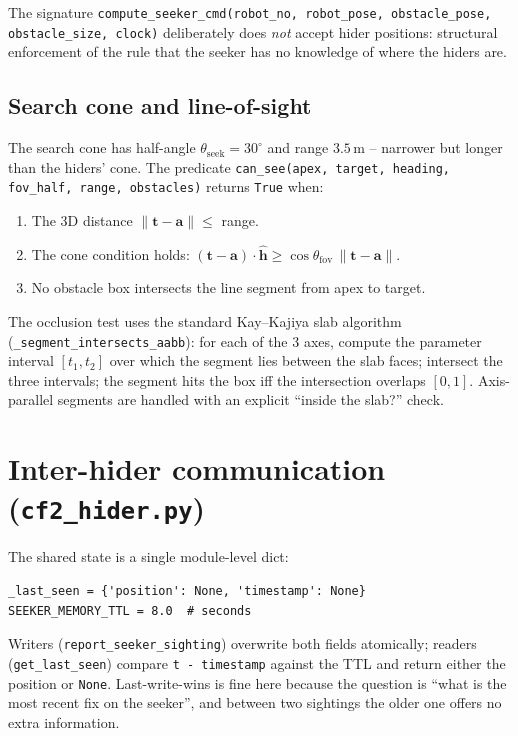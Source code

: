 \documentclass[11pt,a4paper]{article}
\newcommand{\code}[1]{\texttt{#1}}
\newcommand{\vect}[1]{\mathbf{#1}}
\begin{document}
The signature \code{compute\_seeker\_cmd(robot\_no, robot\_pose,
obstacle\_pose, obstacle\_size, clock)} deliberately does \emph{not} accept
hider positions: structural enforcement of the rule that the seeker has no
knowledge of where the hiders are.

\subsection{Search cone and line-of-sight}

The search cone has half-angle $\theta_\mathrm{seek} = 30^\circ$ and range
$3.5$\,m -- narrower but longer than the hiders' cone. The predicate
\code{can\_see(apex, target, heading, fov\_half, range, obstacles)} returns
\code{True} when:
\begin{enumerate}[leftmargin=1.4em]
  \item The 3D distance $\|\vect{t} - \vect{a}\| \le$ range.
  \item The cone condition holds: $(\vect{t} - \vect{a}) \cdot \hat{\vect{h}}
        \ge \cos\theta_\mathrm{fov}\,\|\vect{t} - \vect{a}\|$.
  \item No obstacle box intersects the line segment from apex to target.
\end{enumerate}

The occlusion test uses the standard Kay--Kajiya slab algorithm
(\code{\_segment\_intersects\_aabb}): for each of the 3 axes, compute the
parameter interval $[t_1, t_2]$ over which the segment lies between the slab
faces; intersect the three intervals; the segment hits the box iff the
intersection overlaps $[0, 1]$. Axis-parallel segments are handled with an
explicit ``inside the slab?'' check.

\section{Inter-hider communication (\code{cf2\_hider.py})}

The shared state is a single module-level dict:
\begin{lstlisting}
_last_seen = {'position': None, 'timestamp': None}
SEEKER_MEMORY_TTL = 8.0  # seconds
\end{lstlisting}
Writers (\code{report\_seeker\_sighting}) overwrite both fields atomically;
readers (\code{get\_last\_seen}) compare \code{t - timestamp} against the TTL
and return either the position or \code{None}. Last-write-wins is fine here
because the question is ``what is the most recent fix on the seeker'', and
between two sightings the older one offers no extra information.
\end{document}
